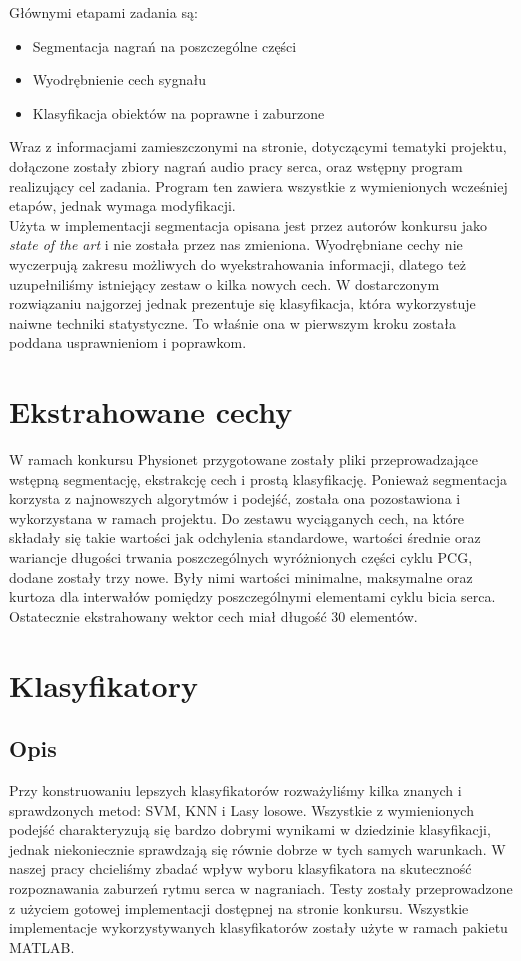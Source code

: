 \documentclass[a4paper]{report}
\begin{document}
Głównymi etapami zadania są:
\begin{itemize}
    \item Segmentacja nagrań na poszczególne części
    \item Wyodrębnienie cech sygnału
    \item Klasyfikacja obiektów na poprawne i zaburzone
\end{itemize}

Wraz z informacjami zamieszczonymi na stronie, dotyczącymi tematyki projektu, dołączone zostały zbiory nagrań audio pracy serca, oraz wstępny program realizujący cel zadania. Program ten zawiera wszystkie z wymienionych wcześniej etapów, jednak wymaga modyfikacji. \\
Użyta w implementacji segmentacja opisana jest przez autorów konkursu jako \textit{state of the art} i nie została przez nas zmieniona. Wyodrębniane cechy nie wyczerpują zakresu możliwych do wyekstrahowania informacji, dlatego też uzupełniliśmy istniejący zestaw o kilka nowych cech. W dostarczonym rozwiązaniu najgorzej jednak prezentuje się klasyfikacja, która wykorzystuje naiwne techniki statystyczne. To właśnie ona w pierwszym kroku została poddana usprawnieniom i poprawkom.\\


\section{Ekstrahowane cechy}
W ramach konkursu Physionet przygotowane zostały pliki przeprowadzające wstępną segmentację, ekstrakcję cech i prostą klasyfikację. Ponieważ segmentacja korzysta z najnowszych algorytmów i podejść, została ona pozostawiona i wykorzystana w ramach projektu. Do zestawu wyciąganych cech, na które składały się takie wartości jak odchylenia standardowe, wartości średnie oraz wariancje długości trwania poszczególnych wyróżnionych części cyklu PCG, dodane zostały trzy nowe. Były nimi wartości minimalne, maksymalne oraz kurtoza dla interwałów pomiędzy poszczególnymi elementami cyklu bicia serca. Ostatecznie ekstrahowany wektor cech miał długość 30 elementów.

\section{Klasyfikatory}

\subsection{Opis}
Przy konstruowaniu lepszych klasyfikatorów rozważyliśmy kilka znanych i sprawdzonych metod: SVM, KNN i Lasy losowe. Wszystkie z wymienionych podejść charakteryzują się bardzo dobrymi wynikami w dziedzinie klasyfikacji, jednak niekoniecznie sprawdzają się równie dobrze w tych samych warunkach. W naszej pracy chcieliśmy zbadać wpływ wyboru klasyfikatora na skuteczność rozpoznawania zaburzeń rytmu serca w nagraniach. Testy zostały przeprowadzone z użyciem gotowej implementacji dostępnej na stronie konkursu. Wszystkie implementacje wykorzystywanych klasyfikatorów zostały użyte w ramach pakietu MATLAB. \\
\end{document}
